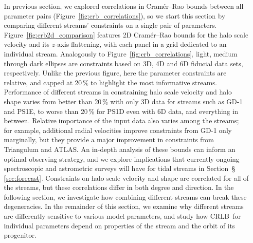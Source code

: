 \documentclass[modern]{aastex61}
\newcommand{\acronym}[1]{{\small{#1}}}
\newcommand{\CRLB}{\acronym{CRLB}}
\begin{document}
In previous section, we explored correlations in Cram\' er--Rao bounds between all parameter pairs (Figure~\ref{fig:crb_correlations}), so we start this section by comparing different streams' constraints on a single pair of parameters.
Figure~\ref{fig:crb2d_comparison} features 2D Cram\' er--Rao bounds for the halo scale velocity and its $z$-axis flattening, with each panel in a grid dedicated to an individual stream.
Analogously to Figure~\ref{fig:crb_correlations}, light, medium through dark ellipses are constraints based on 3D, 4D and 6D fiducial data sets, respectively.
Unlike the previous figure, here the parameter constraints are relative, and capped at 20\,\% to highlight the most informative streams.
Performance of different streams in constraining halo scale velocity and halo shape varies from better than 20\,\% with only 3D data for streams such as GD-1 and PS1E, to worse than 20\,\% for PS1D even with 6D data, and everything in between.
Relative importance of the input data also varies among the streams; for example, additional radial velocities improve constraints from GD-1 only marginally, but they provide a major improvement in constraints from Triangulum and ATLAS.
An in-depth analysis of these bounds can inform an optimal observing strategy, and we explore implications that currently ongoing spectroscopic and astrometric surveys will have for tidal streams in Section~\S\,\ref{sec:forecast}.
Constraints on halo scale velocity and shape are correlated for all of the streams, but these correlations differ in both degree and direction.
In the following section, we investigate how combining different streams can break these degeneracies.
In the remainder of this section, we examine why different streams are differently sensitive to various model parameters, and study how \CRLB\ for individual parameters depend on properties of the stream and the orbit of its progenitor.
\end{document}
